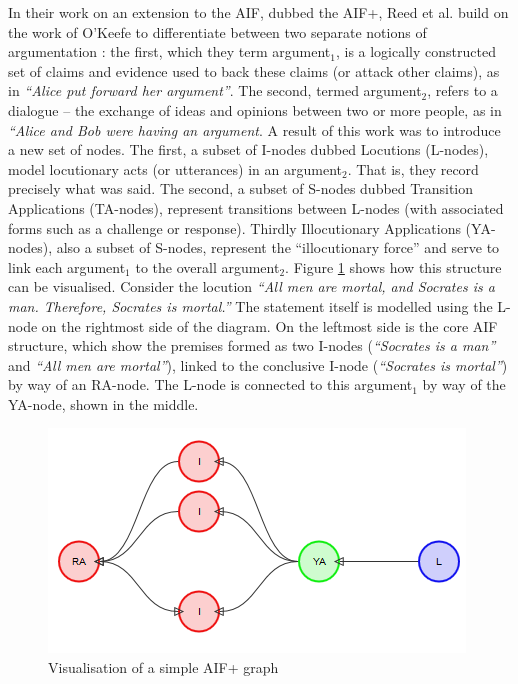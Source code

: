In their work on an extension to the AIF, dubbed the AIF+, Reed et al. build on the work of O'Keefe to differentiate between two separate notions of argumentation \citep{Benoit1992, Reed2008}: the first, which they term argument$_1$, is a logically constructed set of claims and evidence used to back these claims (or attack other claims), as in \textit{``Alice put forward her argument''}. The second, termed argument$_2$, refers to a dialogue -- the exchange of ideas and opinions between two or more people, as in \textit{``Alice and Bob were having an argument}. A result of this work was to introduce a new set of nodes. The first, a subset of I-nodes dubbed Locutions (L-nodes), model locutionary acts (or utterances) in an argument$_2$. That is, they record precisely what was said. The second, a subset of S-nodes dubbed Transition Applications (TA-nodes), represent transitions between L-nodes (with associated forms such as a challenge or response). Thirdly Illocutionary Applications (YA-nodes), also a subset of S-nodes, represent the ``illocutionary force'' and serve to link each argument$_1$ to the overall argument$_2$. Figure \ref{figure:graphs:aifplus} shows how this structure can be visualised. Consider the locution \textit{``All men are mortal, and Socrates is a man. Therefore, Socrates is mortal.''} The statement itself is modelled using the L-node on the rightmost side of the diagram. On the leftmost side is the core AIF structure, which show the premises formed as two I-nodes (\textit{``Socrates is a man''} and \textit{``All men are mortal''}), linked to the conclusive I-node (\textit{``Socrates is mortal''}) by way of an RA-node. The L-node is connected to this argument$_1$ by way of the YA-node, shown in the middle.

\begin{figure}
\centering
\includegraphics[scale=0.5]{./figures/graphs/aifplus.png}
\caption{Visualisation of a simple AIF+ graph}
\label{figure:graphs:aifplus}
\end{figure}

